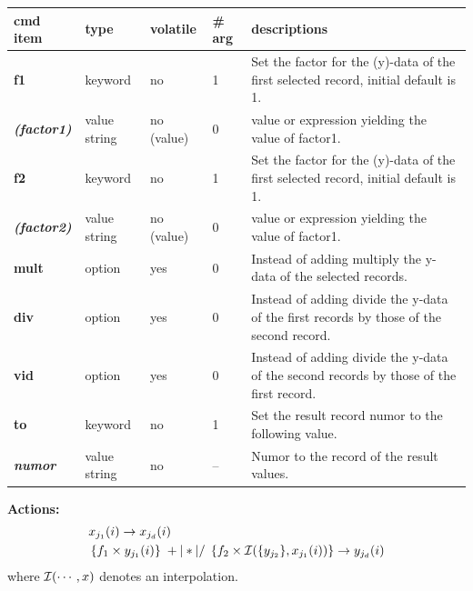 \documentclass[11pt,fleqn]{book} %
\newcommand{\linespace}{\vspace{4ex}}
\newcommand{\var}[1]{{\color{red} \bf \it #1}}
\newcommand{\vol}[2]{{\color{magenta} \bf #1 \it #2}}
\begin{document}
\begin{tabular}{ | l | l | l | l | p{7cm} |}
\hline
  cmd item  &
  type      & 
  volatile  & 
  \# arg    & 
  descriptions \\ 
\hline\hline %
  {\bf f1}  &
  keyword   & 
  no        & 
  1         & 
  Set the factor for the (y)-data of the first selected record, initial default is 1. \\ 
\hline
  { \var{(factor1)} }  &
  value string         & 
  no (value)           & 
  0                    & 
  value or expression yielding the value of factor1.  \\ 
 \hline
  {\bf f2}  &
  keyword   & 
  no        & 
  1         & 
  Set the factor for the (y)-data of the first selected record, initial default is 1. \\ 
\hline
  { \var{(factor2)} }   &
  value string         & 
  no (value)           & 
  0                    & 
  value or expression yielding the value of factor1.  \\ 
\hline
  \vol{mult}{}          &
  option              & 
  yes                 & 
  0                   &  
  Instead of adding multiply the y-data of the selected records.\\ 
\hline
  \vol{div}{}           &
  option              & 
  yes                 & 
  0                   &  
  Instead of adding divide the y-data of the first records by those of the second record.\\ 
 \hline
  \vol{vid}{}           &
  option              & 
  yes                 & 
  0                   &  
  Instead of adding divide the y-data of the second records by those of the first record.\\ 
 \hline
  {\bf to}             &
  keyword              & 
  no                   & 
  1                    & 
  Set the result record numor to the following value.\\
 \hline
  \var{numor}          &
  value string         & 
  no                   & 
  --                   & 
  Numor to the record of the result values.\\
\hline
\end{tabular}


\linespace
\linespace

{\bf Actions:}
\linespace
\begin{align}
&  x_{j_1}(i)                       \rightarrow x_{j_d}(i)    \\
&  \left \{ f_1 \times y_{j_1}(i) \right \}
 \; +|*|/ \; 
\left \{ f_2 \times {\cal I}(\{y_{j_2}\},  x_{j_1}(i)) \right \} \rightarrow y_{j_d}(i)  
\end{align}
where ${{\cal I}(\cdots, x})$ denotes an interpolation.
\normalsize
\end{document}

